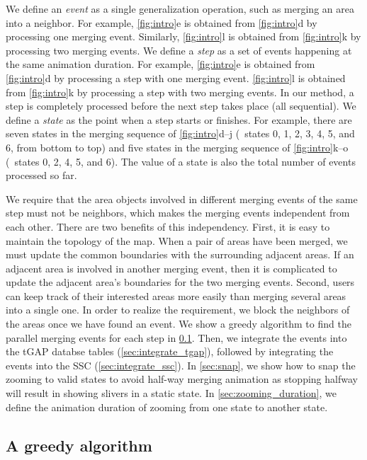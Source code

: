 \documentclass[]{interact}
\begin{document}
We define an \emph{event} as a single generalization operation, 
such as merging an area into a neighbor.
For example, \fig\ref{fig:intro}e is obtained from 
\fig\ref{fig:intro}d by processing one merging event.
Similarly, \fig\ref{fig:intro}l is obtained from 
\fig\ref{fig:intro}k by processing two merging events.
We define a \emph{step} as 
a set of events happening at the same animation duration.
For example, 
\fig\ref{fig:intro}e is obtained from 
\fig\ref{fig:intro}d by processing a step with one merging event.
\fig\ref{fig:intro}l is obtained from 
\fig\ref{fig:intro}k by processing a step with two merging events.
In our method, a step is completely processed 
before the next step takes place (all sequential).
We define a \emph{state} as the point when a step starts or finishes.
For example, there are seven states 
in the merging sequence of \figs\ref{fig:intro}d--j
(\ie~states 0, 1, 2, 3, 4, 5, and 6, from bottom to top)
and five states in the merging sequence of \figs\ref{fig:intro}k--o 
(\ie~states 0, 2, 4, 5, and 6).
The value of a state is also the total number of events processed so far.


We require that 
the area objects involved in different merging events of the same step 
must not be neighbors, 
which makes the merging events independent from each other.
There are two benefits of this independency.
First, it is easy to maintain the topology of the map.
When a pair of areas have been merged, 
we must update the common boundaries with the surrounding adjacent areas.
If an adjacent area is involved in another merging event,
then it is complicated to update the adjacent area's boundaries
for the two merging events.
Second, users can keep track of their interested areas more easily
than merging several areas into a single one.
In order to realize the requirement,
we block the neighbors of the areas once we have found an event.
We show a greedy algorithm to find the parallel merging events for each step
in \sect\ref{sec:greedy_algo}.
Then, we integrate the events into the tGAP databse tables
(\sect\ref{sec:integrate_tgap}),
followed by integrating the events into the SSC 
(\sect\ref{sec:integrate_ssc}).
In \sect\ref{sec:snap}, we show how to snap the zooming to valid states
to avoid half-way merging animation 
as stopping halfway will result in showing slivers in a static state.
In \sect\ref{sec:zooming_duration}, we define 
the animation duration of zooming from one state to another state.



\subsection{A greedy algorithm}
\label{sec:greedy_algo}
\end{document}
